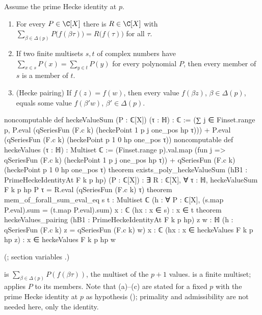 \begin{theorem}\label{ch19:thm:pairing}
Assume the prime Hecke identity at $p$.
\begin{enumerate}[label=(\alph*)]
\item For every $P\in\C[X]$ there is $R\in\C[X]$ with $\sum_{\beta\in\Delta(p)}P\bigl(f(\beta\tau)\bigr)=R\bigl(f(\tau)\bigr)$ for all $\tau$.
\item If two finite multisets $s,t$ of complex numbers have $\sum_{x\in s}P(x)=\sum_{y\in t}P(y)$ for every polynomial $P$, then
  every member of $s$ is a member of $t$.
\item (Hecke pairing) If $f(z)=f(w)$, then every value $f(\beta z)$, $\beta\in\Delta(p)$, equals some value $f(\beta'w)$, $\beta'\in\Delta(p)$.
\end{enumerate}
\end{theorem}
\begin{leancode}
noncomputable def heckeValueSum (P : ℂ[X]) (τ : ℍ) : ℂ :=
  (∑ j ∈ Finset.range p, P.eval (qSeriesFun (F.c k) (heckePoint 1 p j one_pos hp τ))) +
    P.eval (qSeriesFun (F.c k) (heckePoint p 1 0 hp one_pos τ))
noncomputable def heckeValues (τ : ℍ) : Multiset ℂ :=
  (Finset.range p).val.map (fun j => qSeriesFun (F.c k) (heckePoint 1 p j one_pos hp τ)) +
    {qSeriesFun (F.c k) (heckePoint p 1 0 hp one_pos τ)}
theorem exists_poly_heckeValueSum (hB1 : PrimeHeckeIdentityAt F k p hp) (P : ℂ[X]) :
    ∃ R : ℂ[X], ∀ τ : ℍ, heckeValueSum F k p hp P τ = R.eval (qSeriesFun (F.c k) τ)
theorem mem_of_forall_sum_eval_eq {s t : Multiset ℂ}
    (h : ∀ P : ℂ[X], (s.map P.eval).sum = (t.map P.eval).sum) {x : ℂ} (hx : x ∈ s) :
    x ∈ t
theorem heckeValues_pairing (hB1 : PrimeHeckeIdentityAt F k p hp) {z w : ℍ}
    (h : qSeriesFun (F.c k) z = qSeriesFun (F.c k) w) {x : ℂ}
    (hx : x ∈ heckeValues F k p hp z) : x ∈ heckeValues F k p hp w
\end{leancode}
(; section variables .)
\begin{dictionary}
 is $\sum_{\beta\in\Delta(p)}P(f(\beta\tau))$,  the multiset of the $p+1$ values.
 is a finite multiset;  applies $P$ to its members.  Note that (a)--(c) are stated for a
fixed $p$ with the prime Hecke identity at $p$ as hypothesis (); primality and
admissibility are not needed here, only the identity.
\end{dictionary}
